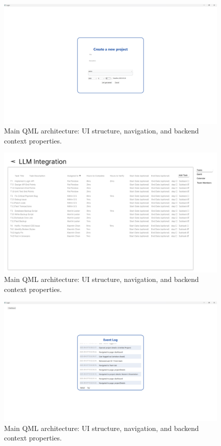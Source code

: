 \documentclass{report}
\begin{document}
\begin{figure}
\centering
\includegraphics[width=\linewidth,height=\textheight,keepaspectratio]{png_files/ProjectCreation.png}
\caption{Main QML architecture: UI structure, navigation, and backend context properties.}
\end{figure}

\begin{figure}
\centering
\includegraphics[width=\linewidth,height=\textheight,keepaspectratio]{png_files/ProjectDetails.png}
\caption{Main QML architecture: UI structure, navigation, and backend context properties.}
\end{figure}

\begin{figure}
\centering
\includegraphics[width=\linewidth,height=\textheight,keepaspectratio]{png_files/Event_log.png}
\caption{Main QML architecture: UI structure, navigation, and backend context properties.}
\end{figure}
\end{document}

